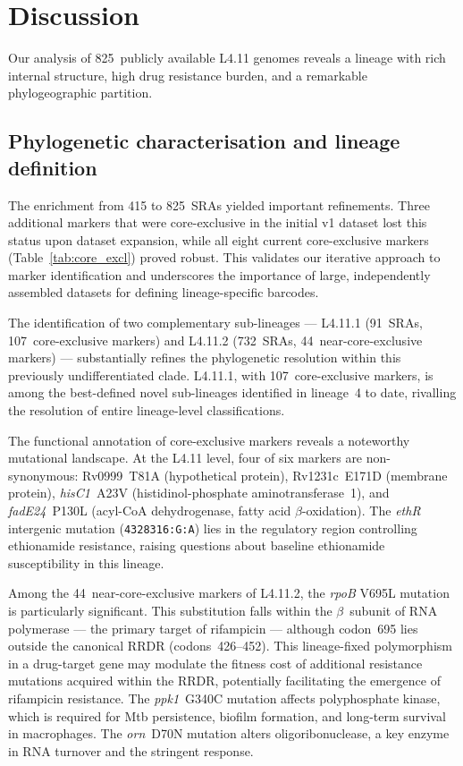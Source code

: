 \documentclass[11pt,a4paper]{article}
\newcommand{\spdi}[1]{\texttt{#1}}
\newcommand{\lignee}[1]{\textsf{#1}}
\begin{document}
\section{Discussion}

Our analysis of 825~publicly available \lignee{L4.11} genomes reveals a
lineage with rich internal structure, high drug resistance burden, and a
remarkable phylogeographic partition.

\subsection{Phylogenetic characterisation and lineage definition}

The enrichment from 415 to 825~SRAs yielded important refinements.  Three
additional markers that were core-exclusive in the initial v1 dataset lost
this status upon dataset expansion, while all eight current core-exclusive
markers (Table~\ref{tab:core_excl}) proved robust.  This validates our
iterative approach to marker identification and underscores the importance
of large, independently assembled datasets for defining lineage-specific
barcodes.

The identification of two complementary sub-lineages ---
\lignee{L4.11.1} (91~SRAs, 107~core-exclusive markers) and
\lignee{L4.11.2} (732~SRAs, 44~near-core-exclusive markers) --- substantially
refines the phylogenetic resolution within this previously undifferentiated
clade.  \lignee{L4.11.1}, with 107~core-exclusive markers, is among the
best-defined novel sub-lineages identified in lineage~4 to date, rivalling
the resolution of entire lineage-level classifications.

The functional annotation of core-exclusive markers reveals a noteworthy
mutational landscape.  At the \lignee{L4.11} level, four of six markers are
non-synonymous: Rv0999~T81A (hypothetical protein), Rv1231c~E171D (membrane
protein), \textit{hisC1}~A23V (histidinol-phosphate aminotransferase~1),
and \textit{fadE24}~P130L (acyl-CoA dehydrogenase, fatty acid $\beta$-oxidation).
The \textit{ethR} intergenic mutation (\spdi{4328316:G:A}) lies in the
regulatory region controlling ethionamide resistance, raising questions about
baseline ethionamide susceptibility in this lineage.

Among the 44~near-core-exclusive markers of \lignee{L4.11.2}, the \textit{rpoB}
V695L mutation is particularly significant.  This substitution falls within
the $\beta$~subunit of RNA polymerase --- the primary target of rifampicin
--- although codon~695 lies outside the canonical RRDR (codons~426--452).
This lineage-fixed polymorphism in a drug-target gene may modulate the
fitness cost of additional resistance mutations acquired within the RRDR,
potentially facilitating the emergence of rifampicin resistance.  The
\textit{ppk1}~G340C mutation affects polyphosphate kinase, which is required
for Mtb persistence, biofilm formation, and long-term survival in
macrophages.  The \textit{orn}~D70N mutation alters oligoribonuclease, a key
enzyme in RNA turnover and the stringent response.
\end{document}
